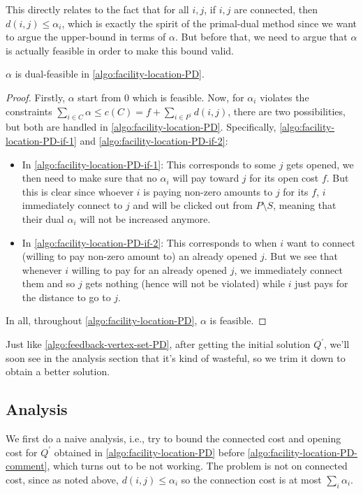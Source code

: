 This directly relates to the fact that for all \(i, j\), if \(i, j\) are connected, then \(d(i, j) \leq \alpha _i\), which is exactly the spirit of the primal-dual method since we want to argue the upper-bound in terms of \(\alpha\). But before that, we need to argue that \(\alpha \) is actually feasible in order to make this bound valid.

\begin{lemma}
	\(\alpha \) is dual-feasible in \autoref{algo:facility-location-PD}.
\end{lemma}
\begin{proof}
	Firstly, \(\alpha\) start from \(0\) which is feasible. Now, for \(\alpha _i\) violates the constraints \(\sum_{i\in C} \alpha \leq c(C) = f + \sum_{i\in P^\prime }d(i, j)\), there are two possibilities, but both are handled in \autoref{algo:facility-location-PD}. Specifically, \autoref{algo:facility-location-PD-if-1} and \autoref{algo:facility-location-PD-if-2}:
	\begin{itemize}
		\item In \autoref{algo:facility-location-PD-if-1}: This corresponds to some \(j\) gets opened, we then need to make sure that no \(\alpha _i\) will pay toward \(j\) for its open cost \(f\). But this is clear since whoever \(i\) is paying non-zero amounts to \(j\) for its \(f\), \(i\) immediately connect to \(j\) and will be clicked out from \(P\setminus S\), meaning that their dual \(\alpha _i\) will not be increased anymore.
		\item In \autoref{algo:facility-location-PD-if-2}: This corresponds to when \(i\) want to connect (willing to pay non-zero amount to) an already opened \(j\). But we see that whenever \(i\) willing to pay for an already opened \(j\), we immediately connect them and so \(j\) gets nothing (hence will not be violated) while \(i\) just pays for the distance to go to \(j\).
	\end{itemize}
	In all, throughout \autoref{algo:facility-location-PD}, \(\alpha \) is feasible.
\end{proof}

\begin{note}
	Just like \autoref{algo:feedback-vertex-set-PD}, after getting the initial solution \(Q^\prime \), we'll soon see in the analysis section that it's kind of wasteful, so we trim it down to obtain a better solution.
\end{note}

\subsection{Analysis}
We first do a naive analysis, i.e., try to bound the connected cost and opening cost for \(Q^\prime \) obtained in \autoref{algo:facility-location-PD} before \autoref{algo:facility-location-PD-comment}, which turns out to be not working. The problem is not on connected cost, since as noted above, \(d(i, j) \leq \alpha _i\) so the connection cost is at most \(\sum_{i} \alpha _i\).

